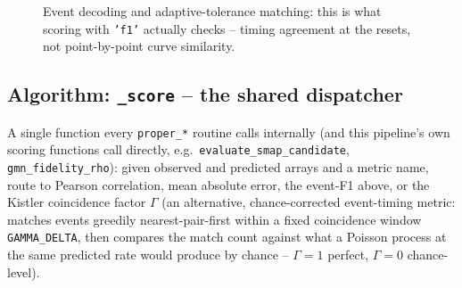 \documentclass[11pt]{article}
\begin{document}
\begin{figure}[h]
\centering
{}
\caption{Event decoding and adaptive-tolerance matching: this is what scoring with \texttt{'f1'} actually checks -- timing agreement at the resets, not point-by-point curve similarity.}
\label{fig:event-matching}
\end{figure}

\subsection{Algorithm: \texttt{\_score} -- the shared dispatcher}
A single function every \texttt{proper\_*} routine calls internally (and this pipeline's own scoring functions call directly, e.g.\ \texttt{evaluate\_smap\_candidate}, \texttt{gmn\_fidelity\_rho}): given observed and predicted arrays and a metric name, route to Pearson correlation, mean absolute error, the event-F1 above, or the Kistler coincidence factor $\Gamma$ (an alternative, chance-corrected event-timing metric: matches events greedily nearest-pair-first within a fixed coincidence window \texttt{GAMMA\_DELTA}, then compares the match count against what a Poisson process at the same predicted rate would produce by chance -- $\Gamma{=}1$ perfect, $\Gamma{=}0$ chance-level).
\end{document}
